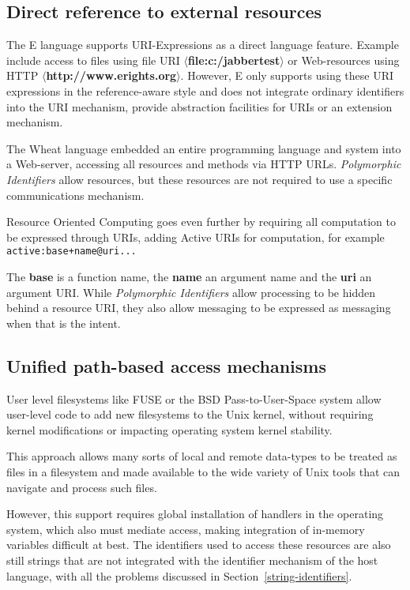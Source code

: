 \documentclass[preprint,authoryear]{llncs}
\begin{document}
\subsection{Direct reference to external resources}


The E language\cite{MillerRobustComposition}  supports URI-Expressions as a
direct language feature.  Example include access to files
using file URI  {\bf $\langle$file:c:/jabbertest$\rangle$} or Web-resources using HTTP {\bf  $\langle$http://www.erights.org$\rangle$}.  However,
E only supports using these URI expressions in the reference-aware style and does not integrate 
ordinary identifiers into the URI mechanism, provide abstraction facilities 
for URIs or an extension mechanism. 

The Wheat language \cite{wheat} embedded an entire programming language
and system into a Web-server, accessing all resources and methods via
HTTP URLs.  \emph{Polymorphic Identifiers} allow resources, but these resources
are not required to use a specific communications mechanism.


Resource Oriented Computing \cite{roc} goes even further by
requiring all computation to be expressed through URIs, adding Active URIs
for computation, for example {\tt   active:{base}+{name}@{uri}...}

The {\bf base} is a function name, the {\bf name} an argument name and the
{\bf uri} an argument URI.
 While \emph{Polymorphic Identifiers} allow processing to be
hidden behind a resource URI, they also allow messaging to be expressed
as messaging when that is the intent.



\subsection{Unified path-based access mechanisms}


User level filesystems like FUSE\cite{fuse} or the BSD Pass-to-User-Space\cite{kantee:puffs} 
system allow
user-level code to add new filesystems to the Unix kernel, without requiring
kernel modifications or impacting operating system kernel stability.

This approach allows many sorts of local and remote data-types to be 
treated as files in a filesystem and made available to the wide variety
of Unix tools that can navigate and process such files.  

However, this support requires global installation of handlers in the operating
system, which also must mediate access, making integration of in-memory 
variables difficult at best.  The identifiers used to access these resources
are also still strings that are not integrated with the identifier mechanism of
the host language, with all the problems discussed in Section~\ref{string-identifiers}.
\end{document}
